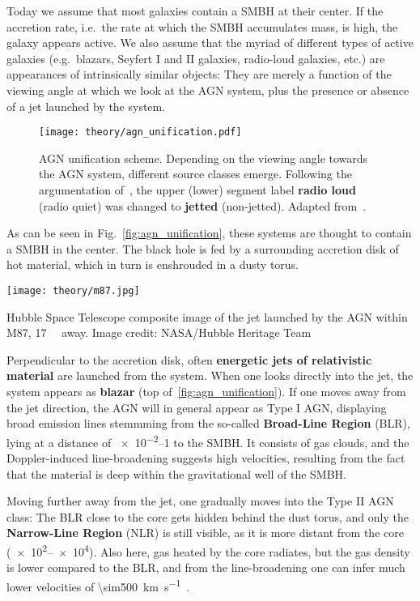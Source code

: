 Today we assume that most galaxies contain a SMBH at their center. If the accretion rate, i.e.\ the rate at which the SMBH accumulates mass, is high, the galaxy appears active. We also assume that the myriad of different types of active galaxies (e.g.\ blazars, Seyfert I and II galaxies, radio-loud galaxies, etc.) are appearances of intrinsically similar objects: They are merely a function of the viewing angle at which we look at the AGN system, plus the presence or absence of a jet launched by the system.

\begin{figure}[htb]
    \texttt{[image: theory/agn\_unification.pdf]}
    \caption[AGN]{AGN unification scheme. Depending on the viewing angle towards the AGN system, different source classes emerge. Following the argumentation of~\cite{Padovani2017}, the upper (lower) segment label \textbf{radio loud} (radio quiet) was changed to \textbf{jetted} (non-jetted). Adapted from~\cite{Thorne2022}.}
\end{figure}

As can be seen in Fig.~\ref{fig:agn_unification}, these systems are thought to contain a SMBH in the center. The black hole is fed by a surrounding accretion disk of hot material, which in turn is enshrouded in a dusty torus.

\begin{marginfigure}
    \texttt{[image: theory/m87.jpg]}
    \caption[M87 jet]{Hubble Space Telescope composite image of the jet launched by the AGN within M87, \SI{17}{\mega\parsec} away. Image credit: NASA/Hubble Heritage Team}
\end{marginfigure}

Perpendicular to the accretion disk, often \textbf{energetic jets of relativistic material} are launched from the system. When one looks directly into the jet, the system appears as \textbf{blazar} (top of~\ref{fig:agn_unification}). If one moves away from the jet direction, the AGN will in general appear as Type I AGN, displaying broad emission lines stemmming from the so-called \textbf{Broad-Line Region} (BLR), lying at a distance of \SIrange{e-2}{1}{\parsec} to the SMBH. It consists of gas clouds, and the Doppler-induced line-broadening suggests high velocities, resulting from the fact that the material is deep within the gravitational well of the SMBH.

Moving further away from the jet, one gradually moves into the Type II AGN class: The BLR close to the core gets hidden behind the dust torus, and only the  \textbf{Narrow-Line Region} (NLR) is still visible, as it is more distant from the core (\SIrange{e2}{e4}{\parsec}). Also here, gas heated by the core radiates, but the gas density is lower compared to the BLR, and from the line-broadening one can infer much lower velocities of \SI{\sim500}{\kilo\m\per\s}~.

